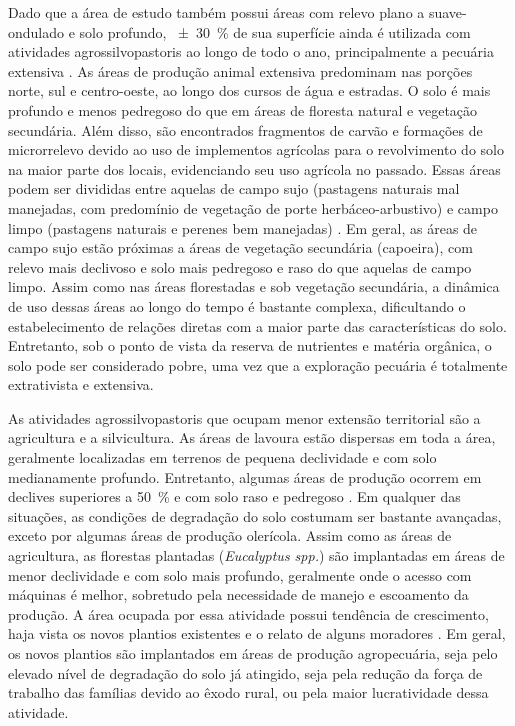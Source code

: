 Dado que a área de estudo também possui áreas com relevo plano a suave-ondulado e solo profundo, 
\SI{\pm30}{\percent} de sua superfície ainda é utilizada com atividades agrossilvopastoris ao longo de todo o 
ano, principalmente a pecuária extensiva \cite{SamuelRosaEtAl2011a}. As áreas de produção animal extensiva 
predominam nas porções norte, sul e centro-oeste, ao longo dos cursos de água e estradas. O solo é mais 
profundo e menos pedregoso do que em áreas de floresta natural e vegetação secundária. Além disso, são 
encontrados fragmentos de carvão e formações de microrrelevo devido ao uso de implementos agrícolas para o 
revolvimento do solo na maior parte dos locais, evidenciando seu uso agrícola no passado. Essas áreas podem 
ser divididas entre aquelas de campo sujo (pastagens naturais mal manejadas, com predomínio de vegetação de 
porte herbáceo-arbustivo) e campo limpo (pastagens naturais e perenes bem manejadas) 
\cite{SamuelRosaEtAl2011a}. Em geral, as áreas de campo sujo estão próximas a áreas de vegetação secundária 
(capoeira), com relevo mais declivoso e solo mais pedregoso e raso do que aquelas de campo limpo. Assim como 
nas áreas florestadas e sob vegetação secundária, 
a dinâmica de uso dessas áreas ao longo do tempo é bastante complexa, dificultando o estabelecimento de 
relações diretas com a maior parte das características do solo. Entretanto, sob o ponto de vista da reserva de 
nutrientes e matéria orgânica, o solo pode ser considerado pobre, uma vez que a exploração pecuária é 
totalmente extrativista e extensiva.


As atividades agrossilvopastoris que ocupam menor extensão territorial são a agricultura e a silvicultura. As 
áreas de lavoura estão dispersas em toda a área, geralmente localizadas em terrenos de pequena declividade e 
com solo medianamente profundo. Entretanto, algumas áreas de produção ocorrem em declives superiores a 
\SI{50}{\percent} e com solo raso e pedregoso \cite{SamuelRosaEtAl2011a}. Em qualquer das situações, as 
condições de degradação do solo costumam ser bastante avançadas, exceto por algumas áreas de produção 
olerícola. Assim como as áreas de agricultura, as florestas plantadas (\textit{Eucalyptus spp.}) são 
implantadas em áreas de menor declividade e com solo mais profundo, geralmente onde o acesso com máquinas é 
melhor, sobretudo pela necessidade de manejo e escoamento da produção. A área ocupada por essa atividade 
possui 
tendência de crescimento, haja vista os novos plantios existentes e o relato de alguns moradores 
\cite{SamuelRosaEtAl2011a}. Em geral, os novos plantios são implantados em áreas de produção agropecuária, 
seja 
pelo elevado nível de degradação do solo já atingido, seja pela redução da força de trabalho das famílias 
devido ao êxodo rural, ou pela maior lucratividade dessa atividade.

